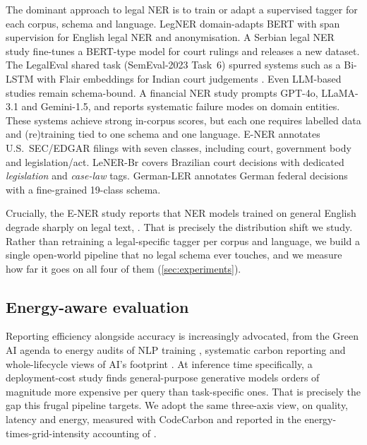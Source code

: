 The dominant approach to legal NER is to train or adapt a supervised tagger for each corpus, schema and language. LegNER \citep{karamitsos2025legner} domain-adapts BERT with span supervision for English legal NER and anonymisation. A Serbian legal NER study \citep{kalusev2025serbian} fine-tunes a BERT-type model for court rulings and releases a new dataset. The LegalEval shared task (SemEval-2023 Task~6) spurred systems such as a Bi-LSTM with Flair embeddings for Indian court judgements \citep{ramesh2023flairnlp}. Even LLM-based studies remain schema-bound. A financial NER study \citep{lu2025financial} prompts GPT-4o, LLaMA-3.1 and Gemini-1.5, and reports systematic failure modes on domain entities. These systems achieve strong in-corpus scores, but each one requires labelled data and (re)training tied to one schema and one language. E-NER \citep{au2022ener} annotates U.S.\ SEC/EDGAR filings with seven classes, including court, government body and legislation/act.  LeNER-Br \citep{luzdearaujo2018lenerbr} covers Brazilian court decisions with dedicated \emph{legislation} and \emph{case-law} tags. German-LER \citep{leitner2020germanler} annotates German federal decisions with a fine-grained 19-class schema.

Crucially, the E-NER study \citep{au2022ener} reports that NER models trained on general English degrade sharply on legal text, . That is precisely the distribution shift we study. Rather than retraining a legal-specific tagger per corpus and language, we build a single open-world pipeline that no legal schema ever touches, and we measure how far it goes on all four of them (\autoref{sec:experiments}).

\subsection{Energy-aware evaluation}
Reporting efficiency alongside accuracy is increasingly advocated, from the Green AI agenda \citep{schwartz2020greenai} to energy audits of NLP training \citep{strubell2019energy}, systematic carbon reporting \citep{henderson2020systematic,patterson2022carbon} and whole-lifecycle views of AI's footprint \citep{wu2022sustainable}. At inference time specifically, a deployment-cost study \citep{luccioni2024power} finds general-purpose generative models orders of magnitude more expensive per query than task-specific ones. That is precisely the gap this frugal pipeline targets. We adopt the same three-axis view, on quality, latency and energy, measured with CodeCarbon \citep{codecarbon2024} and reported in the energy-times-grid-intensity accounting of \citet{lacoste2019quantifying}.
